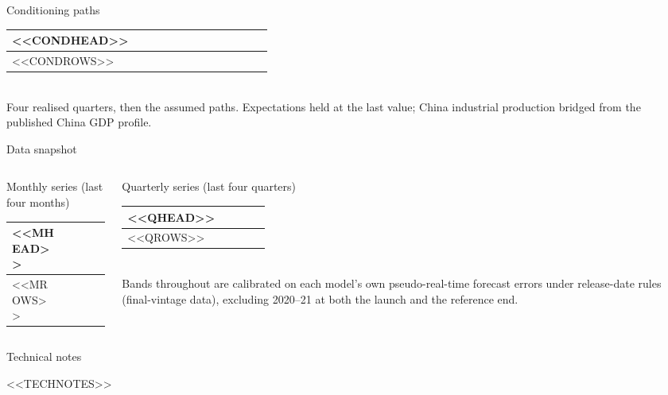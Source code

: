 \documentclass[aspectratio=169,10pt]{beamer}
\begin{document}
\begin{frame}{Conditioning paths}
  \centering
  {\tiny
  \begin{tabular}{@{}l*{12}{c}@{}}
    \toprule
    <<CONDHEAD>> \\
    \midrule
<<CONDROWS>>
    \bottomrule
  \end{tabular}}\\[0.6em]
  {\scriptsize\color{muted}Four realised quarters, then the assumed paths.
  Expectations held at the last value; China industrial production bridged from
  the published China GDP profile.}
\end{frame}

\begin{frame}{Data snapshot}
  \begin{columns}[T]
    \begin{column}{0.55\textwidth}
      {\footnotesize Monthly series (last four months)}\\[0.3em]
      {\tiny
      \begin{tabular}{@{}l*{4}{r}@{}}
        \toprule
        <<MHEAD>> \\
        \midrule
<<MROWS>>
        \bottomrule
      \end{tabular}}
    \end{column}
    \begin{column}{0.45\textwidth}
      {\footnotesize Quarterly series (last four quarters)}\\[0.3em]
      {\tiny
      \begin{tabular}{@{}l*{4}{r}@{}}
        \toprule
        <<QHEAD>> \\
        \midrule
<<QROWS>>
        \bottomrule
      \end{tabular}}\\[0.9em]
      {\scriptsize\color{muted}Bands throughout are calibrated on each model's own
      pseudo-real-time forecast errors under release-date rules (final-vintage
      data), excluding 2020--21 at both the launch and the reference end.}
    \end{column}
  \end{columns}
\end{frame}

\begin{frame}{Technical notes}
  \small
  \begin{itemize}\setlength{\itemsep}{0.5em}
<<TECHNOTES>>
  \end{itemize}
\end{frame}
\end{document}
